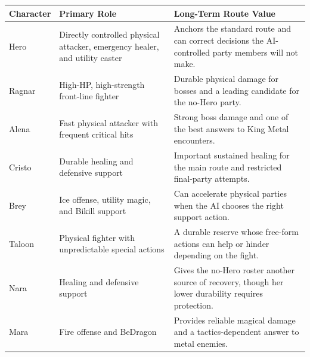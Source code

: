 \documentclass[
  american,
  10pt,
  letterpaper,
  oneside,
  open=any]{scrreprt}
\newcounter{none} %
\newenvironment{guidetable}{%
  \small\setstretch{1.0}%
  \setlength{\tabcolsep}{4pt}%
  \setlength{\LTpre}{8pt}\setlength{\LTpost}{10pt}%
  \renewcommand{\arraystretch}{1.16}%
}{ }
\begin{document}
\begin{guidetable}

{\def\LTcaptype{none} %
\begin{longtable}[]{@{}
  >{\raggedright\arraybackslash}p{}
  >{\raggedright\arraybackslash}p{}
  >{\raggedright\arraybackslash}p{}@{}}
\toprule\noalign{}
\begin{minipage}[b]{\linewidth}\raggedright
\color{GuideGreen}\bfseries Character
\end{minipage} & \begin{minipage}[b]{\linewidth}\raggedright
\color{GuideGreen}\bfseries Primary Role
\end{minipage} & \begin{minipage}[b]{\linewidth}\raggedright
\color{GuideGreen}\bfseries Long-Term Route Value
\end{minipage} \\
\midrule\noalign{}
\endhead
\bottomrule\noalign{}
\endlastfoot
Hero & Directly controlled physical attacker, emergency healer, and
utility caster & Anchors the standard route and can correct decisions
the AI-controlled party members will not make. \\
Ragnar & High-HP, high-strength front-line fighter & Durable physical
damage for bosses and a leading candidate for the no-Hero party. \\
Alena & Fast physical attacker with frequent critical hits & Strong boss
damage and one of the best answers to King Metal encounters. \\
Cristo & Durable healing and defensive support & Important sustained
healing for the main route and restricted final-party attempts. \\
Brey & Ice offense, utility magic, and Bikill support & Can accelerate
physical parties when the AI chooses the right support action. \\
Taloon & Physical fighter with unpredictable special actions & A durable
reserve whose free-form actions can help or hinder depending on the
fight. \\
Nara & Healing and defensive support & Gives the no-Hero roster another
source of recovery, though her lower durability requires protection. \\
Mara & Fire offense and BeDragon & Provides reliable magical damage and
a tactics-dependent answer to metal enemies. \\
\end{longtable}
}

\end{guidetable}
\end{document}
